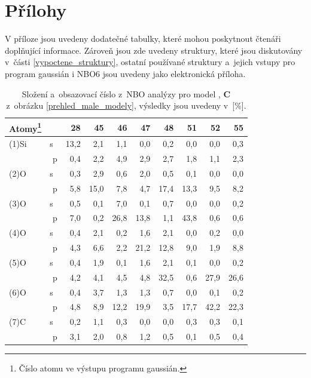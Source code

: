 \documentclass[
digital, %
table,   %
nolof,     %
nolot,     %
oneside,
]{fithesis3}
\begin{document}
\chapter{Přílohy}
V příloze jsou uvedeny dodatečné tabulky, které mohou poskytnout čtenáři doplňující informace. Zároveň jsou zde uvedeny struktury, které jsou diskutovány v~části \ref{vypoctene_struktury}, ostatní používané struktury a~jejich vstupy pro program gaussián i NBO6 jsou uvedeny jako elektronická příloha.
\begin{table}[H]
\begin{minipage}{\textwidth}
\caption{Složení a~obsazovací číslo z~NBO analýzy pro model ,  \textbf{C} z~obrázku \ref{prehled_male_modely}, výsledky jsou uvedeny v~[\%].}
\begin{center}
\begin{tabular}{|l|r|r|r|r|r|r|r|r|r|}
\hline
\label{si_ch3_och3_5_MPA}Atomy\footnote{Číslo atomu ve výstupu programu gaussián.}  &  & 28 & 45 & 46 & 47 & 48 & 51 & 52 & 55 \\ \hline
(1)Si & s~& 13,2  & 2,1  & 1,1  & 0,0  & 0,2  & 0,0  & 0,0  & 0,3  \\ \hline
& p & 0,4  & 2,2  & 4,9  & 2,9  & 2,7  & 1,8  & 1,1  & 2,3  \\ \hline
(2)O & s~& 0,3  & 2,9  & 0,6  & 2,0  & 0,5  & 0,1  & 0,0  & 0,0  \\ \hline
& p & 5,8  & 15,0  & 7,8  & 4,7  & 17,4  & 13,3  & 9,5  & 8,2  \\ \hline
(3)O & s~& 0,5  & 0,1  & 7,0  & 0,1  & 0,7  & 0,0  & 0,0  & 0,2  \\ \hline
& p & 7,0  & 0,2  & 26,8  & 13,8  & 1,1  & 43,8  & 0,6  & 0,6  \\ \hline
(4)O & s~& 0,4  & 2,1  & 0,2  & 1,6  & 2,1  & 0,0  & 0,2  & 0,0  \\ \hline
& p & 4,3  & 6,6  & 2,2  & 21,2  & 12,8  & 9,0  & 1,9  & 8,8  \\ \hline
(5)O & s~& 0,4  & 1,9  & 0,1  & 1,6  & 2,1  & 0,1  & 0,0  & 0,2  \\ \hline
& p & 4,2  & 4,1  & 4,5  & 4,8  & 32,5  & 0,6  & 27,9  & 26,6  \\ \hline
(6)O & s~& 0,4  & 3,7  & 1,3  & 1,3  & 0,7  & 0,0  & 0,1  & 0,2  \\ \hline
& p & 4,8  & 8,9  & 12,2  & 19,9  & 3,5  & 17,7  & 42,2  & 22,3  \\ \hline
(7)C & s~& 0,2  & 1,1  & 0,3  & 0,0  & 0,0  & 0,3  & 0,3  & 0,1  \\ \hline
& p & 3,1  & 2,0  & 0,8  & 1,2  & 0,5  & 0,1  & 0,5  & 0,4  \\ \hline
\end{tabular}\end{center}\end{minipage}
\end{table}
\end{document}
